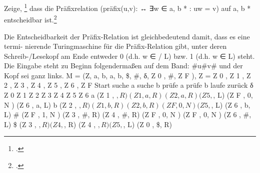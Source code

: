 \documentclass{bschlangaul-aufgabe}
\begin{document}

Zeige, \footcite{66112:2002:03} dass die
Präﬁxrelation (präﬁx(u,v): ↔ ∃w ∈ {a, b} * : uw = v) auf {a, b} *
entscheidbar ist.\footcite[Aufgabe 7a)]{theo:ab:4}

Die Entscheidbarkeit der Präﬁx-Relation ist gleichbedeutend damit, dass es eine termi-
nierende Turingmaschine für die Präﬁx-Relation gibt, unter deren Schreib-/Lesekopf am
Ende entweder 0 (d.h. w ∈
/ L) bzw. 1 (d.h. w ∈ L) steht.
Die Eingabe steht zu Beginn folgendermaßen auf dem Band: \#u\#v\# und der Kopf sei
ganz links.
M = (Z, {a, b}, {a, b, \$, \#}, δ, Z 0 , \#, {Z F }), Z = {Z 0 , Z 1 , Z 2 , Z 3 , Z 4 , Z 5 , Z 6 , Z F }
Start
suche a
suche b
prüfe a
prüfe b
laufe zurück
δ
Z 0
Z 1
Z 2
Z 3
Z 4
Z 5
Z 6
a (Z 1 , $, R) (Z 1 , a, R) (Z 2 , a, R)
(Z 5 , $, L) (Z F , 0, N )
(Z 6 , a, L)
b (Z 2 , $, R)
(Z 1 , b, R)
(Z 2 , b, R) (Z F , 0, N ) (Z 5 , $, L)
(Z 6 , b, L)
\# (Z F , 1, N ) (Z 3 , \#, R) (Z 4 , \#, R) (Z F , 0, N ) (Z F , 0, N ) (Z 6 , \#, L)
\$
(Z 3 , $, R) (Z 4 , $, R) (Z 4 , $, R) (Z 5 , $, L) (Z 0 , \$, R)
\end{document}
